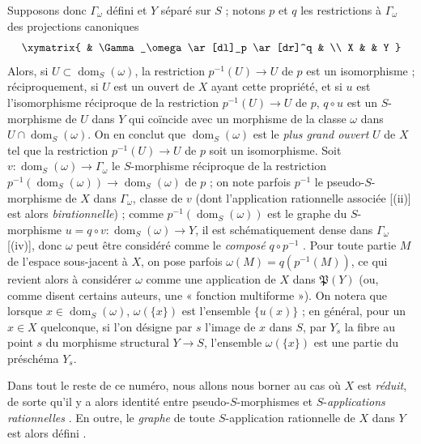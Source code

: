\begin{env}[20.4.2]
\label{IV.20.4.2}
Supposons donc $\Gamma_\omega$ défini et $Y$ séparé sur $S$ ; notons $p$ et $q$ les restrictions à $\Gamma_\omega$ des projections canoniques
\[
  \xymatrix{
  & \Gamma_\omega \ar[dl]_p \ar[dr]^q & \\
  X & & Y
  }
\]
Alors, si $U\subset\operatorname{dom}_S(\omega)$, la restriction $p^{-1}(U)\to U$ de $p$ est un isomorphisme  ; réciproquement, si $U$ est un ouvert de $X$ ayant cette propriété, et si $u$ est l'isomorphisme réciproque de la restriction $p^{-1}(U)\to U$ de $p$, $q\circ u$ est un $S$-morphisme de $U$ dans $Y$ qui coïncide avec un morphisme de la classe $\omega$ dans $U\cap\operatorname{dom}_S(\omega)$.
On en conclut que $\operatorname{dom}_S(\omega)$ est le \emph{plus grand ouvert} $U$ de $X$ tel que la restriction $p^{-1}(U)\to U$ de $p$ soit un
isomorphisme.
Soit $v:\operatorname{dom}_S(\omega)\to\Gamma_\omega$ le $S$-morphisme réciproque de la restriction $p^{-1}(\operatorname{dom}_S(\omega))\to\operatorname{dom}_S(\omega)$ de $p$ ; on note parfois $p^{-1}$ le pseudo-$S$-morphisme de $X$ dans $\Gamma_\omega$, classe de $v$ (dont l'application rationnelle associée [(ii)] est alors \emph{birationnelle}) ; comme $p^{-1}(\operatorname{dom}_S(\omega))$ est le graphe du $S$-morphisme $u=q\circ v:\operatorname{dom}_S(\omega)\to Y$, il est schématiquement dense dans $\Gamma_\omega$ [(iv)], donc $\omega$ peut être considéré comme le \emph{composé} $q\circ p^{-1}$ .
Pour toute partie $M$ de l'espace sous-jacent à $X$, on pose parfois $\omega(M)=q(p^{-1}(M))$, ce qui revient alors à considérer $\omega$ comme une application de $X$ dans $\mathfrak{P}(Y)$ (ou, comme disent certains auteurs, une « fonction multiforme »).
On notera que lorsque $x\in\operatorname{dom}_S(\omega)$, $\omega(\{x\})$ est l'ensemble $\{u(x)\}$ ; en général, pour un $x\in X$ quelconque, si l'on désigne par $s$ l'image de $x$ dans $S$, par $Y_s$ la fibre au point $s$ du morphisme structural $Y\to S$, l'ensemble $\omega(\{x\})$ est une partie du préschéma $Y_s$.
\end{env}

\begin{env}[20.4.3]
\label{IV.20.4.3}
Dans tout le reste de ce numéro, nous allons nous borner au cas où $X$ est \emph{réduit}, de sorte qu'il y a alors identité entre pseudo-$S$-morphismes et $S$-\emph{applications rationnelles} .
En outre, le \emph{graphe} de toute $S$-application rationnelle de $X$ dans $Y$ est alors défini .
\end{env}


